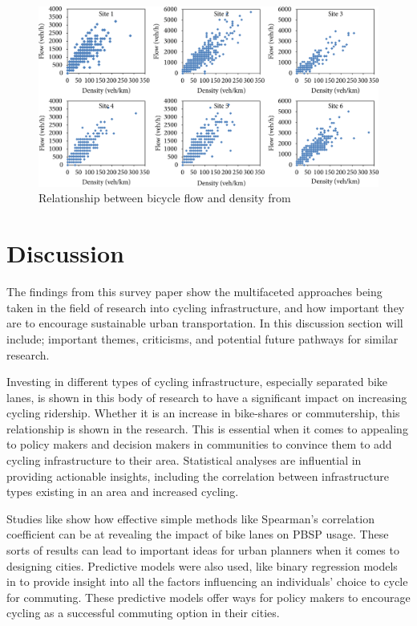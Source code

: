 \documentclass[12pt, letterpaper]{article}
\begin{document}
\begin{figure}[tbp]
    \centering \includegraphics[width=1\textwidth]{flowdensity.png}
    \caption{Relationship between bicycle flow and density from \citet{6Pu2017}}
    \label{fig:flow}
\end{figure}


\section{Discussion}
\label{sec:disc}

The findings from this survey paper show the multifaceted approaches being taken in the field of research into cycling infrastructure, and how important they are to encourage sustainable urban transportation. In this discussion section will include; important themes, criticisms, and potential future pathways for similar research. \par

Investing in different types of cycling infrastructure, especially separated bike lanes, is shown in this body of research to have a significant impact on increasing cycling ridership. Whether it is an increase in bike-shares or commutership, this relationship is shown in the research. This is essential when it comes to appealing to policy makers and decision makers in communities to convince them to add cycling infrastructure to their area. Statistical analyses are influential in providing actionable insights, including the correlation between infrastructure types existing in an area and increased cycling. \par

Studies like \citet{1MateoBabiano2016} show how effective simple methods like Spearman's correlation coefficient can be at revealing the impact of bike lanes on PBSP usage. These sorts of results can lead to important ideas for urban planners when it comes to designing cities. Predictive models were also used, like binary regression models in \citet{2Yujun2019} to provide insight into all the factors influencing an individuals' choice to cycle for commuting. These predictive models offer ways for policy makers to encourage cycling as a successful commuting option in their cities.\par
\end{document}
